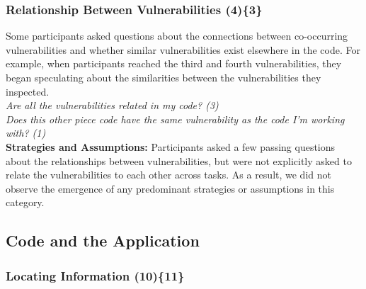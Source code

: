 \documentclass[10pt,journal,compsoc]{IEEEtran}
\begin{document}


\subsubsection{Relationship Between Vulnerabilities (4)\{3\}}\label{rbb}

Some participants asked questions about the connections between co-occurring vulnerabilities and whether similar vulnerabilities exist elsewhere in the code. 
For example, when participants reached the third and fourth vulnerabilities, they began speculating about the similarities between the vulnerabilities they inspected.
\\

\noindent\emph{Are all the vulnerabilities related in my code? (3)} \\
\emph{Does this other piece code have the same vulnerability as the code I'm working with? (1)} 
\\

\textbf{Strategies and Assumptions:}
Participants asked a few passing questions about the relationships between vulnerabilities, but were not explicitly asked to relate the vulnerabilities to each other across tasks. 
As a result, we did not observe the emergence of any predominant strategies or assumptions in this category.

%


\subsection{Code and the Application}
\label{sec:results-ca}
\subsubsection{Locating Information (10)\{11\}}\label{li}
\end{document}
